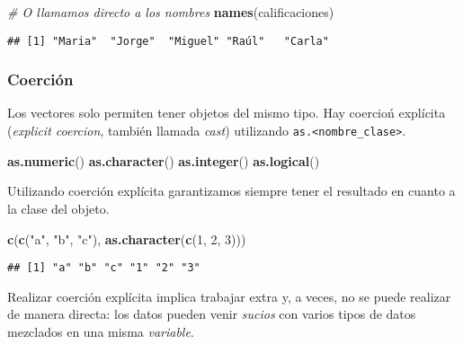 \documentclass[]{article}
\newenvironment{Shaded}{\begin{snugshade}}{\end{snugshade}}
\newcommand{\KeywordTok}[1]{\textcolor[rgb]{0.13,0.29,0.53}{\textbf{#1}}}
\newcommand{\DecValTok}[1]{\textcolor[rgb]{0.00,0.00,0.81}{#1}}
\newcommand{\StringTok}[1]{\textcolor[rgb]{0.31,0.60,0.02}{#1}}
\newcommand{\CommentTok}[1]{\textcolor[rgb]{0.56,0.35,0.01}{\textit{#1}}}
\newcommand{\NormalTok}[1]{#1}
\begin{document}
\begin{Shaded}
\begin{Highlighting}[]
\CommentTok{# O llamamos directo a los nombres}
\KeywordTok{names}\NormalTok{(calificaciones)}
\end{Highlighting}
\end{Shaded}

\begin{verbatim}
## [1] "Maria"  "Jorge"  "Miguel" "Raúl"   "Carla"
\end{verbatim}

\subsubsection{Coerción}\label{coercion}

Los vectores solo permiten tener objetos del mismo tipo. Hay coercioń
explícita (\emph{explicit coercion}, también llamada \emph{cast})
utilizando \texttt{as.\textless{}nombre\_clase\textgreater{}}.

\begin{Shaded}
\begin{Highlighting}[]
\KeywordTok{as.numeric}\NormalTok{()}
\KeywordTok{as.character}\NormalTok{()}
\KeywordTok{as.integer}\NormalTok{()}
\KeywordTok{as.logical}\NormalTok{()}
\end{Highlighting}
\end{Shaded}

Utilizando coerción explícita garantizamos siempre tener el resultado en
cuanto a la clase del objeto.

\begin{Shaded}
\begin{Highlighting}[]
\KeywordTok{c}\NormalTok{(}\KeywordTok{c}\NormalTok{(}\StringTok{"a"}\NormalTok{, }\StringTok{"b"}\NormalTok{, }\StringTok{"c"}\NormalTok{), }\KeywordTok{as.character}\NormalTok{(}\KeywordTok{c}\NormalTok{(}\DecValTok{1}\NormalTok{, }\DecValTok{2}\NormalTok{, }\DecValTok{3}\NormalTok{)))}
\end{Highlighting}
\end{Shaded}

\begin{verbatim}
## [1] "a" "b" "c" "1" "2" "3"
\end{verbatim}

Realizar coerción explícita implica trabajar extra y, a veces, no se
puede realizar de manera directa: los datos pueden venir \emph{sucios}
con varios tipos de datos mezclados en una misma \emph{variable}.
\end{document}
